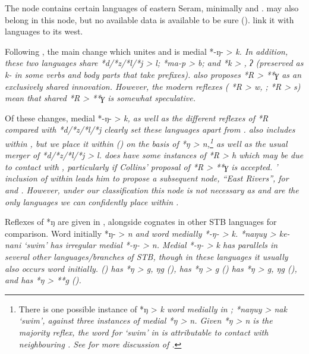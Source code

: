 \newpage
{}
The  node contains certain languages of eastern
Seram, minimally  and .
 may also belong in this node,
but no available data is available to be sure ().
\citet{LoskiLoski1989} link it
with  languages to its west.

Following \citet{Collins1986}, the main change which unites 
and  is medial *-ŋ- > \it{k}.
In addition, these two languages share *d/*z/*l/*j > \it{l};
*ma-p > \it{b}; and *k > {\0},
\it{ʔ} (preserved as \it{k-} in some verbs
and body parts that take prefixes).
\citet{Collins1986} also proposes *R > **ɣ as an exclusively shared innovation.
However, the modern reflexes ( *R > \it{w}, {\0}; 
*R > \it{s}) mean that shared *R > **ɣ is somewhat speculative.

Of these changes, medial *-ŋ- > \it{k},
as well as the different reflexes of *R compared with *d/*z/*l/*j
clearly set these languages apart from .
\citet{Collins1986} also includes  within ,
but we place it within  () on
the basis of  *ŋ > \it{n},\footnote{
		There is one possible instance
		of *ŋ > \it{k} word medially in ; *naŋuy > \it{nak} ‘swim’,
		against three instances of medial *ŋ > \it{n}.
		Given *ŋ > \it{n} is the majority reflex, the word for ‘swim’
		in  is attributable to contact with neighbouring .
		See  for more discussion of .}
as well as the usual merger of *d/*z/*l/*j > \it{l}.
 does have some instances of *R > \it{h} which may
be due to contact with ,
particularly if Collins’ proposal of *R > **ɣ is accepted.
\citeauthor{Collins1986}’ inclusion of  within 
leads him to propose a subsequent node,
“East Rivers”, for  and .
However, under our classification this node is not necessary
as  and  are the only languages
we can confidently place within .

Reflexes of *ŋ are given in ,
alongside cognates in other STB languages for comparison.
Word initially *ŋ- > \it{n}
and word medially *-ŋ- > \it{k}.
 *naŋuy > \it{ke-nani} ‘swim’ has irregular medial *-ŋ- > \it{n}.
Medial *-ŋ- > \it{k} has parallels in several other languages/branches
of STB, though in these languages it usually also occurs word initially.
 () has *ŋ > \it{g, ŋg} (),
 has *ŋ > \it{g} ()
 has *ŋ > \it{g, ŋg} (), and
 has *ŋ > **g ().

